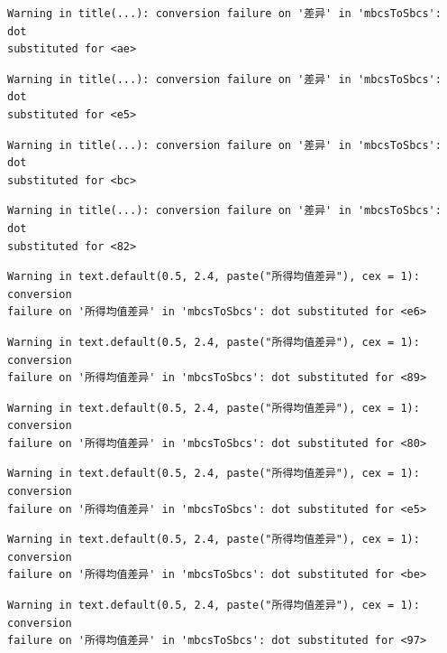 \documentclass[
  letterpaper,
  DIV=11,
  numbers=noendperiod]{scrreprt}
\begin{document}
\begin{verbatim}
Warning in title(...): conversion failure on '差异' in 'mbcsToSbcs': dot
substituted for <ae>
\end{verbatim}

\begin{verbatim}
Warning in title(...): conversion failure on '差异' in 'mbcsToSbcs': dot
substituted for <e5>
\end{verbatim}

\begin{verbatim}
Warning in title(...): conversion failure on '差异' in 'mbcsToSbcs': dot
substituted for <bc>
\end{verbatim}

\begin{verbatim}
Warning in title(...): conversion failure on '差异' in 'mbcsToSbcs': dot
substituted for <82>
\end{verbatim}

\begin{verbatim}
Warning in text.default(0.5, 2.4, paste("所得均值差异"), cex = 1): conversion
failure on '所得均值差异' in 'mbcsToSbcs': dot substituted for <e6>
\end{verbatim}

\begin{verbatim}
Warning in text.default(0.5, 2.4, paste("所得均值差异"), cex = 1): conversion
failure on '所得均值差异' in 'mbcsToSbcs': dot substituted for <89>
\end{verbatim}

\begin{verbatim}
Warning in text.default(0.5, 2.4, paste("所得均值差异"), cex = 1): conversion
failure on '所得均值差异' in 'mbcsToSbcs': dot substituted for <80>
\end{verbatim}

\begin{verbatim}
Warning in text.default(0.5, 2.4, paste("所得均值差异"), cex = 1): conversion
failure on '所得均值差异' in 'mbcsToSbcs': dot substituted for <e5>
\end{verbatim}

\begin{verbatim}
Warning in text.default(0.5, 2.4, paste("所得均值差异"), cex = 1): conversion
failure on '所得均值差异' in 'mbcsToSbcs': dot substituted for <be>
\end{verbatim}

\begin{verbatim}
Warning in text.default(0.5, 2.4, paste("所得均值差异"), cex = 1): conversion
failure on '所得均值差异' in 'mbcsToSbcs': dot substituted for <97>
\end{verbatim}
\end{document}
